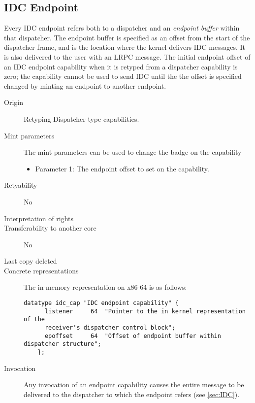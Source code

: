 \subsection{IDC Endpoint}
    
Every IDC endpoint refers both to a dispatcher and an \emph{endpoint
  buffer} within that dispatcher. The endpoint buffer is specified as
an offset from the start of the dispatcher frame, and is the location
where the kernel delivers IDC messages. It is also delivered to the
user with an LRPC message.  The initial endpoint offset of an IDC
endpoint capability when it is retyped from a dispatcher capability is
zero; the capability cannot be used to send IDC until the the offset
is specified changed by minting an endpoint to another endpoint.

\begin{description}
\item[Origin] Retyping Dispatcher type capabilities.

\item[Mint parameters] The mint parameters can be used to change the
  badge on the capability
  \begin{itemize}
  \item Parameter 1: The endpoint offset to set on the capability.
  \end{itemize}
  
\item[Retyability] No
  
\item[Interpretation of rights] 
  
\item[Transferability to another core] No

\item[Last copy deleted] 
  
\item[Concrete representations] The in-memory representation on x86-64
  is as follows:
  
  \begin{lstlisting}[language=Mackerel]
    datatype idc_cap "IDC endpoint capability" {
      listener     64  "Pointer to the in kernel representation of the
      receiver's dispatcher control block";
      epoffset     64  "Offset of endpoint buffer within dispatcher structure";
    };
  \end{lstlisting}
  
\item[Invocation] Any invocation of an endpoint capability causes the
  entire message to be delivered to the dispatcher to which the
  endpoint refers (see \ref{sec:IDC}).
  \end{description}

